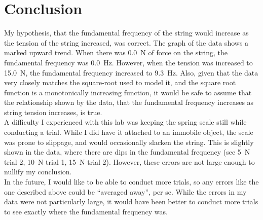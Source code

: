 \documentclass[a4paper]{article}
\begin{document}
    \section{Conclusion}
        My hypothesis, that the fundamental frequency of the string would increase as the
        tension of the string increased, was correct. The graph of the data shows
        a marked upward trend. When there was \SI{0.0}{\N} of force on the string, the
        fundamental frequency was \SI{0.0}{\hertz}. However, when the tension was increased
        to \SI{15.0}{\N}, the fundamental frequency increased to \SI{9.3}{\hertz}. Also,
        given that the data very closely matches the square-root used to model it, and
        the square root function is a monotonically increasing function, it would be
        safe to assume that the relationship shown by the data, that the fundamental
        frequency increases as string tension increases, is true.
        \\
        A difficulty I experienced with this lab was keeping the spring scale still
        while conducting a trial. While I did have it attached to an immobile object,
        the scale was prone to slippage, and would occasionally slacken the string.
        This is slightly shown in the data, where there are dips in the fundamental
        frequency (see \SI{5}{\N} trial 2, \SI{10}{\N} trial 1, \SI{15}{\N} trial 2).
        However, these errors are not large enough to nullify my conclusion.
        \\
        In the future, I would like to be able to conduct more trials, so any errors
        like the one described above could be ``averaged away'', per se. While the
        errors in my data were not particularly large, it would have been better to
        conduct more trials to see exactly where the fundamental frequency was.
\end{document}
